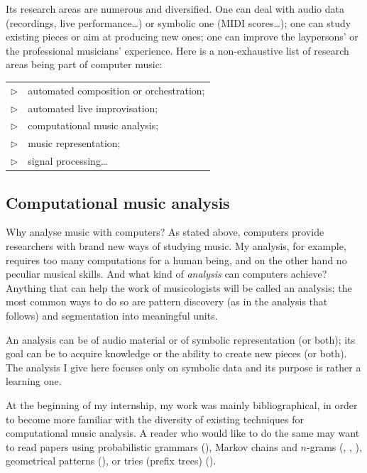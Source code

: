 \documentclass[a4paper,10pt]{article}
\begin{document}
Its research areas are numerous and diversified. One can deal with audio data (recordings, live performance\dots) or symbolic one (MIDI scores\dots); one can study existing pieces or aim at producing new ones; one can improve the laypersons' or the professional musicians' experience. Here is a non-exhaustive list of research areas being part of computer music:

\begin{tabular}{rl}
$\triangleright$ & automated composition or orchestration; \\
$\triangleright$ & automated live improvisation; \\
$\triangleright$ & computational music analysis; \\
$\triangleright$ & music representation; \\
$\triangleright$ & signal processing\dots\\
\end{tabular}


\subsection{Computational music analysis}

Why analyse music with computers? As stated above, computers provide researchers with brand new ways of studying music. My analysis, for example, requires too many computations for a human being, and on the other hand no peculiar musical skills. And what kind of \emph{analysis} can computers achieve? Anything that can help the work of musicologists will be called an analysis; the most common ways to do so are pattern discovery (as in the analysis that follows) and segmentation into meaningful units.

An analysis can be of audio material or of symbolic representation (or both); its goal can be to acquire knowledge or the ability to create new pieces (or both). The analysis I give here focuses only on symbolic data and its purpose is rather a learning one.

At the beginning of my internship, my work was mainly bibliographical, in order to become more familiar with the diversity of existing techniques for computational music analysis. A reader who would like to do the same may want to read papers using probabilistic grammars (\cite{goldabdallah}), Markov chains and $n$-grams (\cite{markov1}, \cite{markov2}, \cite{markov3}), geometrical patterns (\cite{cosiatec}), or tries (prefix trees) (\cite{patminr}).
\end{document}
